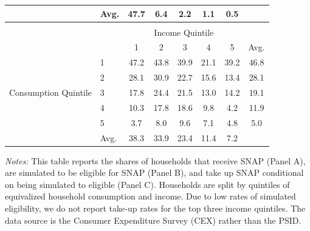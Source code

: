 \begin{table}[t]
\begin{tabular*}{\textwidth}{@{\extracolsep{\fill}}llcccccc@{}}
                                      & Avg. & 47.7 & 6.4 & 2.2 & 1.1 & 0.5 \\ \midrule \addlinespace
\multicolumn{5}{@{}l}{\emph{Panel C: Take-Up Rate Among Simulated Eligibles}}   \\
                                      &   & \multicolumn{5}{c}{Income Quintile}                                                                    \\ \cmidrule{3-8}
                                      &   & 1                  & 2                  & 3                  & 4                  & 5       & Avg.           \\ \cmidrule{3-8}
\multirow{5}{*}{Consumption Quintile} & 1 & 47.2 & 43.8 & 39.9 & 21.1 & 39.2 & 46.8 \\
                                      & 2 & 28.1 & 30.9 & 22.7 & 15.6 & 13.4 & 28.1 \\
                                      & 3 & 17.8 & 24.4 & 21.5 & 13.0 & 14.2 & 19.1 \\
                                      & 4 & 10.3 & 17.8 & 18.6 & 9.8 & 4.2 & 11.9 \\
                                      & 5 & 3.7 & 8.0 & 9.6 & 7.1 & 4.8 & 5.0 \\ 
                                      & Avg. & 38.3 & 33.9 & 23.4 & 11.4 & 7.2 \\                                       \bottomrule
\end{tabular*}
            \begin{spacing}{1}
\begin{tablenotes}
       \item \footnotesize \textit{Notes:} This table reports the shares of households that receive SNAP (Panel A), are simulated to be eligible for SNAP (Panel B), and take up SNAP conditional on being simulated to eligible (Panel C). Households are split by quintiles of equivalized household consumption and income.  Due to low rates of simulated eligibility, we do not report take-up rates for the top three income quintiles. The data source is the Consumer Expenditure Survey (CEX) rather than the PSID. 
      \end{tablenotes}
       \end{spacing}
\end{table}
    

    